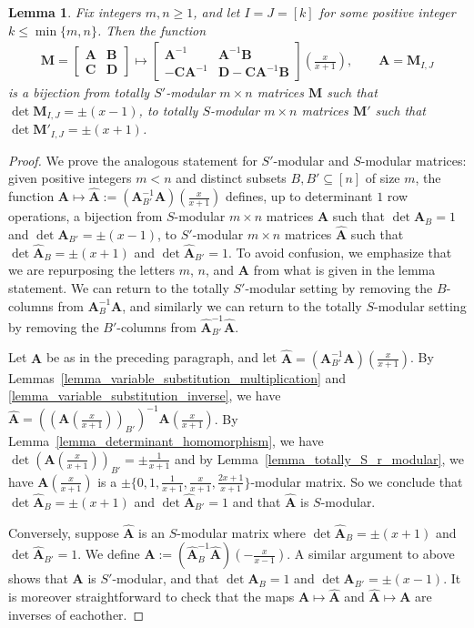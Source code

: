 \documentclass[a4paper, 11pt]{article}
\newcommand{\bA}{\bm{A}}
\newcommand{\bB}{\bm{B}}
\newcommand{\bC}{\bm{C}}
\newcommand{\bD}{\bm{D}}
\newcommand{\bM}{\bm{M}}
\newcommand{\polyS}{S}
\newtheorem{lemma}{Lemma}
\begin{document}
\begin{lemma}
\label{lem_equivalence_of_S_and_S1_modular}
Fix integers $m,n\geq 1$, and let $I=J=[k]$ for some positive integer $k\leq \min \lbrace m,n\rbrace$. Then the function
\begin{align*}
\bM=\begin{bmatrix}\bA & \bB\\
\bC & \bD
\end{bmatrix}\mapsto\begin{bmatrix}\bA^{-1} & \bA^{-1}\bB\\
-\bC\bA^{-1} & \bD-\bC\bA^{-1}\bB
\end{bmatrix}\left(\frac{x}{x+1}\right),\qquad \bA=\bM_{I,J}
\end{align*}
is a bijection from totally $\polyS'$-modular $m\times n$ matrices $\bM$ such that $\det \bM_{I,J}=\pm(x-1)$, to totally $\polyS$-modular $m\times n$ matrices $\bM'$ such that $\det \bM'_{I,J}=\pm(x+1)$.
\end{lemma}
\begin{proof}
We prove the analogous statement for $S'$-modular and $S$-modular matrices: given positive integers $m<n$ and distinct subsets $B,B'\subseteq [n]$ of size $m$, the function $\bA\mapsto\hat{\bA}:=(\bA_{B'}^{-1}\bA)(\tfrac{x}{x+1})$ defines, up to determinant $1$ row operations, a bijection from $S$-modular $m\times n$ matrices $\bA$ such that $\det \bA_{B}=1$ and $\det \bA_{B'}=\pm(x-1)$, to $S'$-modular $m \times n$ matrices $\hat{\bA}$ such that $\det \hat{\bA}_{B}=\pm(x+1)$ and $\det \hat{\bA}_{B'}=1$. To avoid confusion, we emphasize that we are repurposing the letters $m$, $n$, and $\bA$ from what is given in the lemma statement. We can return to the totally $S'$-modular setting by removing the $B$-columns from $\bA^{-1}_B\bA$, and similarly we can return to the totally $S$-modular setting by removing the $B'$-columns from $\hat{\bA}^{-1}_{B'}\hat{\bA}$.

Let $\bA$ be as in the preceding paragraph, and let $\hat{\bA}=(\bA_{B'}^{-1}\bA)(\tfrac{x}{x+1})$. By Lemmas~\ref{lemma_variable_substitution_multiplication} and \ref{lemma_variable_substitution_inverse}, we have $\hat{\bA}=((\bA(\tfrac{x}{x+1}))_{B'})^{-1}\bA(\tfrac{x}{x+1})$. By Lemma~\ref{lemma_determinant_homomorphism}, we have $\det(\bA(\tfrac{x}{x+1}))_{B'}=\pm\tfrac{1}{x+1}$ and by Lemma~\ref{lemma_totally_S_r_modular}, we have $\bA(\tfrac{x}{x+1})$ is a $\pm\{0,1,\tfrac{1}{x+1},\tfrac{x}{x+1},\tfrac{2x+1}{x+1}\}$-modular matrix. So we conclude that $\det\hat{\bA}_B=\pm(x+1)$ and $\det\hat{\bA}_{B'}=1$ and that $\hat{\bA}$ is $S$-modular. 

Conversely, suppose $\hat{\bA}$ is an $S$-modular matrix where $\det\hat{\bA}_B=\pm(x+1)$ and $\det\hat{\bA}_{B'}=1$. We define $\bA:=(\hat{\bA}_{B}^{-1}\hat{\bA})(-\tfrac{x}{x-1})$. A similar argument to above shows that $\bA$ is $S'$-modular, and that $\det \bA_B=1$ and $\det \bA_{B'}=\pm(x-1)$. It is moreover straightforward to check that the maps $\bA\mapsto\hat{\bA}$ and $\hat{\bA}\mapsto\bA$ are inverses of eachother.
\end{proof}
\end{document}
